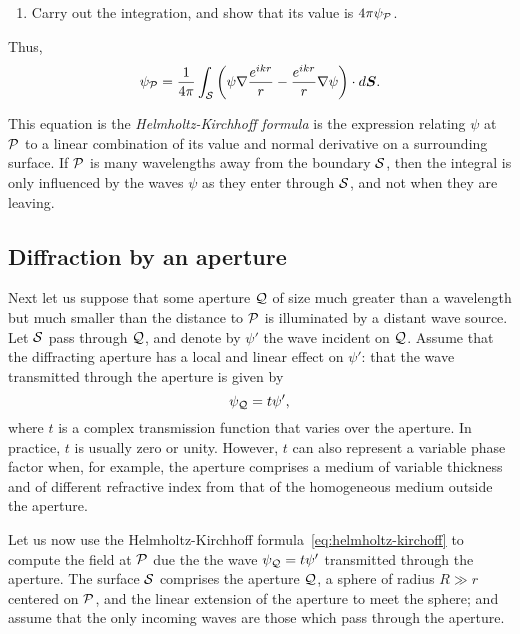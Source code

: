 \documentclass{article}
\newcommand{\be}{\begin{equation}}
\newcommand{\ee}{\end{equation}}
\def\cl#1{{\cal #1}}               %
\begin{document}
\begin{enumerate}
\setcounter{enumi}{\value{count}}
\item Carry out the integration, and show that its value is $4\pi\psi_{\cl{P}}$.
\setcounter{count}{\value{enumi}} 
\end{enumerate}


Thus,
\be
\psi_\cl{P}={1\over 4\pi}\int_\cl{S}\left(\psi\nabla{e^{ikr}\over r}-{e^{ikr}\over r}\nabla\psi\right)\cdot d{\bm S}.
\label{eq:helmholtz-kirchoff}
\ee

This equation is the {\it Helmholtz-Kirchhoff formula} is the expression relating $\psi$ at 
$\cl{P}$ to a linear combination of its value and normal derivative on a surrounding surface.
If $\cl{P}$ is many wavelengths away from the boundary $\cl{S}$, then the integral is only 
influenced by the waves $\psi$ as they enter through $\cl{S}$, and not when they are
leaving.

\subsection*{Diffraction by an aperture}

Next let us suppose that some aperture $\cl{Q}$ of size much greater than a wavelength but
much smaller than the distance to $\cl{P}$ is illuminated by a distant wave source. Let 
$\cl{S}$ pass through $\cl{Q}$, and denote by $\psi'$ the wave incident on $\cl{Q}$. Assume
that the diffracting aperture has a local and linear effect on $\psi'$: that the wave 
transmitted through the aperture is given by 
\[
\psi_\cl{Q}=t\psi',
\]
where $t$ is a complex transmission function that varies over the aperture. In practice, $t$
is usually zero or unity. However, $t$ can also represent a variable phase factor when, for
example, the aperture comprises a medium of variable thickness and of different refractive
index from that of the homogeneous medium outside the aperture.

Let us now use the Helmholtz-Kirchhoff formula~\ref{eq:helmholtz-kirchoff} to compute the field
at $\cl{P}$ due the the wave $\psi_\cl{Q}=t\psi'$ transmitted through the aperture. The
surface $\cl{S}$ comprises the aperture $\cl{Q}$, a sphere of radius $R\gg r$ centered on 
$\cl{P}$, and the linear extension of the aperture to meet the sphere; and assume that the only
incoming waves are those which pass through the aperture. 
\end{document}
